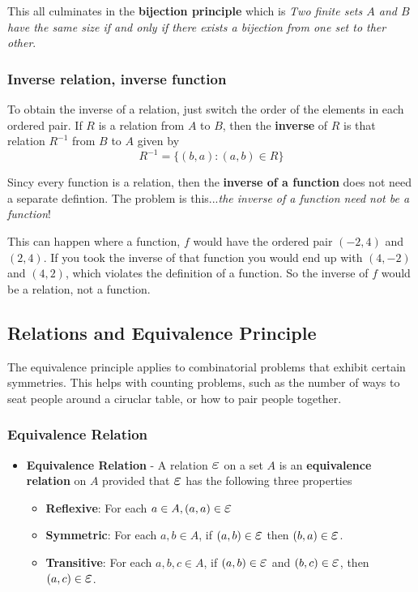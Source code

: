 \documentclass{article}
\begin{document}
This all culminates in the \textbf{bijection principle} which is \textit{Two finite sets $A$ and $B$ have the same size if and only if there exists a bijection from one set to ther other}.

\subsubsection{Inverse relation, inverse function}

To obtain the inverse of a relation, just switch the order of the elements in each ordered pair. If $R$ is a relation from $A$ to $B$, then the \textbf{inverse} of $R$ is that relation $R^{-1}$ from $B$ to $A$ given by
\begin{equation*}
    R^{-1} = \{(b,a): (a,b) \in R \}
\end{equation*}

Sincy every function is a relation, then the \textbf{inverse of a function} does not need a separate defintion. The problem is this...\textit{the inverse of a function need not be a function}!\medskip

This can happen where a function, $f$ would have the ordered pair $(-2,4)$ and $(2,4)$. If you took the inverse of that function you would end up with $(4, -2)$ and $(4, 2)$, which violates the definition of a function. So the inverse of $f$ would be a relation, not a function.

\subsection{Relations and Equivalence Principle}
The equivalence principle applies to combinatorial problems that exhibit certain symmetries. This helps with counting problems, such as the number of ways to seat people around a ciruclar table, or how to pair people together.

\subsubsection{Equivalence Relation}

\begin{itemize}
    \item \textbf{Equivalence Relation} - A relation $\veps$ on a set $A$ is an \textbf{equivalence relation} on $A$ provided that $\veps$ has the following three properties
    \begin{itemize}
        \item \textbf{Reflexive}: For each $a \in A, (a, a) \in \veps$
        \item \textbf{Symmetric}: For each $a, b \in A$, if $(a,b) \in \veps$ then $(b,a) \in \veps$.
        \item \textbf{Transitive}: For each $a,b,c \in A$, if $(a,b) \in \veps$ and $(b,c) \in \veps$, then $(a,c) \in \veps$.
    \end{itemize}
\end{itemize}
\end{document}
